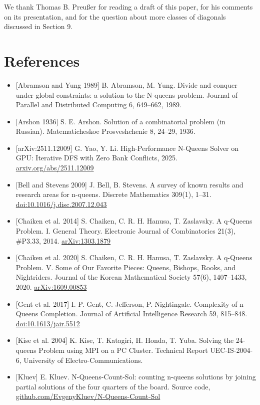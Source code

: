 We thank Thomas B. Preußer for reading a draft of this paper, for his comments on its presentation, and for the question about more classes of diagonals discussed in Section 9.

\section*{References}\small\raggedright
{}

\begin{itemize}
\item{} [Abramson and Yung 1989] B. Abramson, M. Yung. Divide and conquer under global constraints: a solution to the N-queens problem. Journal of Parallel and Distributed Computing 6, 649–662, 1989.
\item{} [Arshon 1936] S. E. Arshon. Solution of a combinatorial problem (in Russian). Matematicheskoe Prosveshchenie 8, 24–29, 1936.
\item{} [arXiv:2511.12009] G. Yao, Y. Li. High-Performance N-Queens Solver on GPU: Iterative DFS with Zero Bank Conflicts, 2025. \href{https://arxiv.org/abs/2511.12009}{arxiv.org/abs/2511.12009}
\item{} [Bell and Stevens 2009] J. Bell, B. Stevens. A survey of known results and research areas for n-queens. Discrete Mathematics 309(1), 1–31. \href{https://doi.org/10.1016/j.disc.2007.12.043}{doi:10.1016/j.disc.2007.12.043}
\item{} [Chaiken et al. 2014] S. Chaiken, C. R. H. Hanusa, T. Zaslavsky. A q-Queens Problem. I. General Theory. Electronic Journal of Combinatorics 21(3), \#P3.33, 2014. \href{https://arxiv.org/abs/1303.1879}{arXiv:1303.1879}
\item{} [Chaiken et al. 2020] S. Chaiken, C. R. H. Hanusa, T. Zaslavsky. A q-Queens Problem. V. Some of Our Favorite Pieces: Queens, Bishops, Rooks, and Nightriders. Journal of the Korean Mathematical Society 57(6), 1407–1433, 2020. \href{https://arxiv.org/abs/1609.00853}{arXiv:1609.00853}
\item{} [Gent et al. 2017] I. P. Gent, C. Jefferson, P. Nightingale. Complexity of n-Queens Completion. Journal of Artificial Intelligence Research 59, 815–848. \href{https://doi.org/10.1613/jair.5512}{doi:10.1613/jair.5512}
\item{} [Kise et al. 2004] K. Kise, T. Katagiri, H. Honda, T. Yuba. Solving the 24-queens Problem using MPI on a PC Cluster. Technical Report UEC-IS-2004-6, University of Electro-Communications.
\item{} [Kluev] E. Kluev. N-Queens-Count-Sol: counting n-queens solutions by joining partial solutions of the four quarters of the board. Source code, \href{https://github.com/EvgenyKluev/N-Queens-Count-Sol}{github.com/EvgenyKluev/N-Queens-Count-Sol}

\end{itemize}
